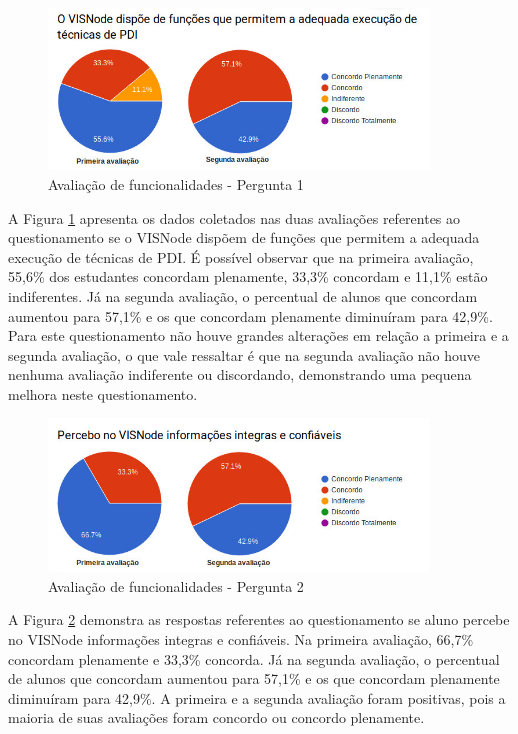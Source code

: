 \documentclass[
	12pt,				%
	oneside,			%
	a4paper,			%
	english,			%
	french,				%
	spanish,			%
	brazil,				%
	]{abntex2}
\begin{document}
\begin{figure}[H]
\centering
\caption{Avaliação de funcionalidades - Pergunta 1}\label{fig:avaliacaoFuncionalidades1}
\includegraphics[width=0.9\textwidth]{imagens/avaliacoes/avaliacao_funcionalidade_1.jpg}
\sourceAuthor
\end{figure}

A Figura \ref{fig:avaliacaoFuncionalidades1} apresenta os dados coletados nas duas avaliações referentes ao questionamento se o VISNode dispõem de funções que permitem a adequada execução de técnicas de PDI. É possível observar que na primeira avaliação, 55,6\% dos estudantes concordam plenamente, 33,3\% concordam e 11,1\% estão indiferentes. Já na segunda avaliação, o percentual de alunos que concordam aumentou para 57,1\% e os que concordam plenamente diminuíram para 42,9\%. Para este questionamento não houve grandes alterações em relação a primeira e a segunda avaliação, o que vale ressaltar é que na segunda avaliação não houve nenhuma avaliação indiferente ou discordando, demonstrando uma pequena melhora neste questionamento.

\begin{figure}[H]
\centering
\caption{Avaliação de funcionalidades - Pergunta 2}\label{fig:avaliacaoFuncionalidades2}
\includegraphics[width=0.9\textwidth]{imagens/avaliacoes/avaliacao_funcionalidade_2.jpg}
\sourceAuthor
\end{figure}

A Figura \ref{fig:avaliacaoFuncionalidades2} demonstra as respostas referentes ao questionamento se aluno percebe no VISNode informações integras e confiáveis. Na primeira avaliação, 66,7\% concordam plenamente e 33,3\% concorda. Já na segunda avaliação, o percentual de alunos que concordam aumentou para 57,1\% e os que concordam plenamente diminuíram para 42,9\%. A primeira e a segunda avaliação foram positivas, pois a maioria de suas avaliações foram concordo ou concordo plenamente.
\end{document}
